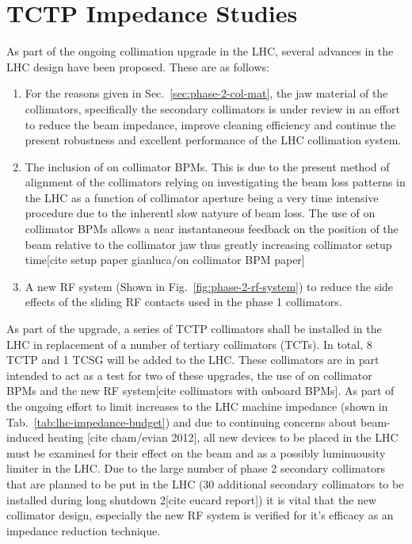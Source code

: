 \section{TCTP Impedance Studies}

As part of the ongoing collimation upgrade in the LHC, several advances in the LHC design have been proposed. These are as follows:

\begin{enumerate}
\item{For the reasons given in Sec.~\ref{sec:phase-2-col-mat}, the jaw material of the collimators, specifically the secondary collimators is under review in an effort to reduce the beam impedance, improve cleaning efficiency and continue the present robustness and excellent performance of the LHC collimation system.}
\item{The inclusion of on collimator BPMs. This is due to the present method of alignment of the collimators relying on investigating the beam loss patterns in the LHC as a function of collimator aperture being a very time intensive procedure due to the inherentl slow natyure of beam loss. The use of on collimator BPMs allows a near instantaneous feedback on the position of the beam relative to the collimator jaw thus greatly increasing collimator setup time[cite setup paper gianluca/on collimator BPM paper]}
\item{A new RF system (Shown in Fig.~\ref{fig:phase-2-rf-system}) to reduce the side effects of the sliding RF contacts used in the phase 1 collimators.}
\end{enumerate}

As part of the upgrade, a series of TCTP collimators shall be installed in the LHC in replacement of a number of tertiary collimators (TCTs). In total, 8 TCTP and 1 TCSG will be added to the LHC. These collimators are in part intended to act as a test for two of these upgrades, the use of on collimator BPMs and the new RF system[cite collimators with onboard BPMs]. As part of the ongoing effort to limit increases to the LHC machine impedance (shown in Tab.~\ref{tab:lhc-impedance-budget}) and due to continuing concerns about beam-induced heating [cite cham/evian 2012], all new devices to be placed in the LHC must be examined for their effect on the beam and as a possibly luminuousity limiter in the LHC. Due to the large number of phase 2 secondary collimators that are planned to be put in the LHC (30 additional secondary collimators to be installed during long shutdown 2[cite eucard report]) it is vital that the new collimator design, especially the new RF system is verified for it's efficacy as an impedance reduction technique.  

